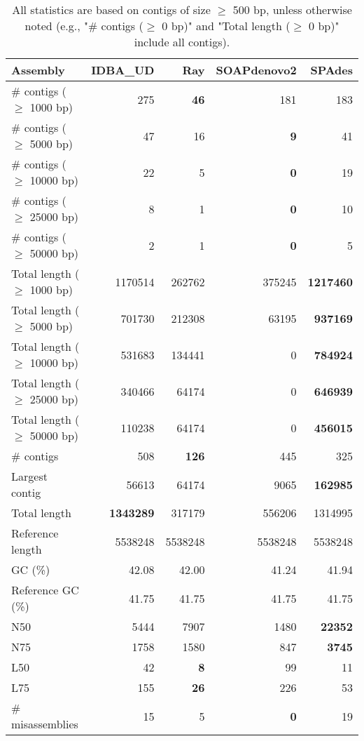 \documentclass[12pt,a4paper]{article}
\begin{document}
\begin{table}[ht]
\begin{center}
\caption{All statistics are based on contigs of size $\geq$ 500 bp, unless otherwise noted (e.g., "\# contigs ($\geq$ 0 bp)" and "Total length ($\geq$ 0 bp)" include all contigs).}
\begin{tabular}{|l*{4}{|r}|}
\hline
Assembly & IDBA\_UD & Ray & SOAPdenovo2 & SPAdes \\ \hline
\# contigs ($\geq$ 1000 bp) & 275 & {\bf 46} & 181 & 183 \\ \hline
\# contigs ($\geq$ 5000 bp) & 47 & 16 & {\bf 9} & 41 \\ \hline
\# contigs ($\geq$ 10000 bp) & 22 & 5 & {\bf 0} & 19 \\ \hline
\# contigs ($\geq$ 25000 bp) & 8 & 1 & {\bf 0} & 10 \\ \hline
\# contigs ($\geq$ 50000 bp) & 2 & 1 & {\bf 0} & 5 \\ \hline
Total length ($\geq$ 1000 bp) & 1170514 & 262762 & 375245 & {\bf 1217460} \\ \hline
Total length ($\geq$ 5000 bp) & 701730 & 212308 & 63195 & {\bf 937169} \\ \hline
Total length ($\geq$ 10000 bp) & 531683 & 134441 & 0 & {\bf 784924} \\ \hline
Total length ($\geq$ 25000 bp) & 340466 & 64174 & 0 & {\bf 646939} \\ \hline
Total length ($\geq$ 50000 bp) & 110238 & 64174 & 0 & {\bf 456015} \\ \hline
\# contigs & 508 & {\bf 126} & 445 & 325 \\ \hline
Largest contig & 56613 & 64174 & 9065 & {\bf 162985} \\ \hline
Total length & {\bf 1343289} & 317179 & 556206 & 1314995 \\ \hline
Reference length & 5538248 & 5538248 & 5538248 & 5538248 \\ \hline
GC (\%) & 42.08 & 42.00 & 41.24 & 41.94 \\ \hline
Reference GC (\%) & 41.75 & 41.75 & 41.75 & 41.75 \\ \hline
N50 & 5444 & 7907 & 1480 & {\bf 22352} \\ \hline
N75 & 1758 & 1580 & 847 & {\bf 3745} \\ \hline
L50 & 42 & {\bf 8} & 99 & 11 \\ \hline
L75 & 155 & {\bf 26} & 226 & 53 \\ \hline
\# misassemblies & 15 & 5 & {\bf 0} & 19 \\ \hline

\end{tabular}
\end{center}
\end{table}
\end{document}
